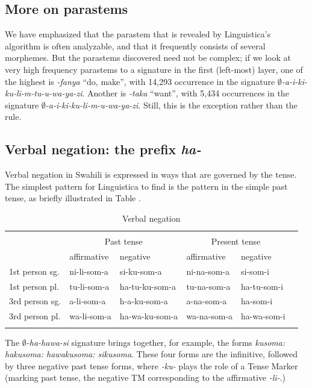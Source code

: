 \documentclass[output=paper,colorlinks,citecolor=brown,
]{langscibook}
\begin{document}
\subsection{More on parastems}

We have emphasized that the parastem that is revealed by Linguistica's algorithm is often analyzable, and that it frequently consists of several morphemes. But the parastems discovered need not be complex; if we look at very high frequency parastems to a signature in the first (left-most) layer, one of the highest is \textit{-fanya} ``do, make'', with 14,293 occurrence in the signature \textit{$\emptyset$-a-i-ki-ku-li-m-tu-u-wa-ya-zi}. Another is \textit{-taka} ``want'', with 5,434 occurrences in the signature  \textit{$\emptyset$-a-i-ki-ku-li-m-u-wa-ya-zi}. Still, this is the exception rather than the rule.
 
\subsection{Verbal negation: the prefix \textit{ha-}}

Verbal negation in Swahili is expressed in ways that are governed by the tense. The simplest pattern for Linguistica to find  is the pattern in the simple past tense, as briefly illustrated in Table .

\begin{table}
\begin{tabular}{llllll} \lsptoprule
\multicolumn{5}{c}{\textit{ku-som-a} `to read'}\\
 & \multicolumn{2}{c}{Past tense} & \multicolumn{2}{c}{Present tense} \\
 & affirmative & negative & affirmative & negative \\
1st person sg. & ni-li-som-a & si-ku-som-a & ni-na-som-a & si-som-i \\
1st person pl.& tu-li-som-a  & ha-tu-ku-som-a & tu-na-som-a & ha-tu-som-i \\
3rd person sg.& a-li-som-a  & h-a-ku-som-a & a-na-som-a & ha-som-i \\
3rd person pl. & wa-li-som-a & ha-wa-ku-som-a & wa-na-som-a & ha-wa-som-i \\\lspbottomrule
\end{tabular} 
\caption{Verbal negation}
\label{negation}
\end{table}

The \textit{$\emptyset$-ha-hawa-si} signature brings together, for example, the forms \textit{kusoma: hakusoma: hawakusoma: sikusoma}. These four forms are the infinitive, followed by three negative past tense forms, where \textit{-ku-} plays the role of a Tense Marker (marking past tense, the negative TM corresponding to the affirmative \textit{-li-}.) 
\end{document}
